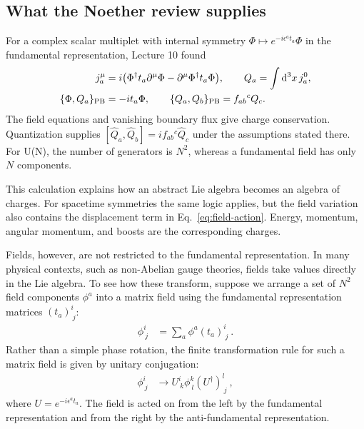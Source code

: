 \documentclass[11pt]{article}
\newcommand{\dd}{\mathrm{d}}
\begin{document}
\subsection{What the Noether review supplies}
For a complex scalar multiplet with internal symmetry
\(\Phi\mapsto e^{-i\epsilon^at_a}\Phi\) in the fundamental representation, Lecture 10 found
\begin{equation}
 \begin{split}
 j_a^\mu&=i\bigl(\Phi^\dagger t_a\partial^\mu\Phi
             -\partial^\mu\Phi^\dagger t_a\Phi\bigr),\qquad
 Q_a=\int\dd^3x\,j_a^0,\\
 \{\Phi,Q_a\}_{\rm PB}&=-it_a\Phi,\qquad
 \{Q_a,Q_b\}_{\rm PB}=f_{ab}{}^cQ_c.
 \end{split}
 \label{eq:review-charges}
\end{equation}
The field equations and vanishing boundary flux give charge conservation.
Quantization supplies \([\widehat Q_a,\widehat Q_b]=if_{ab}{}^c\widehat Q_c\)
under the assumptions stated there. For U(N), the number of generators is
\(N^2\), whereas a fundamental field has only \(N\) components.

This calculation explains how an abstract Lie algebra becomes an algebra
of charges. For spacetime symmetries the same logic applies, but the
field variation also contains the displacement term in
Eq.~\eqref{eq:field-action}. Energy, momentum, angular momentum, and
boosts are the corresponding charges.

Fields, however, are not restricted to the fundamental representation. In many physical contexts, such as non-Abelian gauge theories, fields take values directly in the Lie algebra. To see how these transform, suppose we arrange a set of $N^2$ field components $\phi^a$ into a matrix field using the fundamental representation matrices $(t_a)^i_{\: j}$:
\begin{align}
    \phi^i_{\: j} &= \sum_a \phi^a (t_a)^i_{\: j}\ .
\end{align}
Rather than a simple phase rotation, the finite transformation rule for such a matrix field is given by unitary conjugation:
\begin{align}
    \phi^i_{\: j} &\to U^i_{\: k}\phi^k_{\: l}(U^\dagger)^l_{\: j}\ ,
\end{align}
where $U = e^{-i \epsilon^a t_a}$. The field is acted on from the left by the fundamental representation and from the right by the anti-fundamental representation. 
\end{document}
